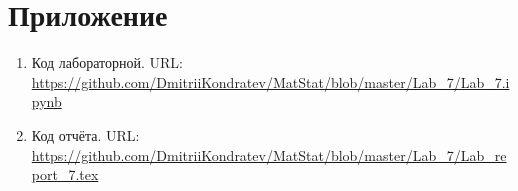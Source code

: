\documentclass[12pt,a4paper]{article}
\begin{document}
	\section{Приложение}
	\begin{enumerate}
		\item Код лабораторной. URL: \url{https://github.com/DmitriiKondratev/MatStat/blob/master/Lab_7/Lab_7.ipynb}
		
		\item Код отчёта. URL: \url{https://github.com/DmitriiKondratev/MatStat/blob/master/Lab_7/Lab_report_7.tex}
		
	\end{enumerate}
\end{document}
